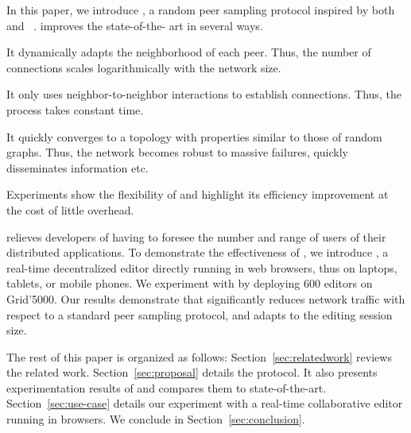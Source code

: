 In this paper, we introduce \SPRAY, a random peer sampling protocol
inspired by both \SCAMP~\cite{ganesh2003peer} and
\CYCLON~\cite{voulgaris2005cyclon}. \SPRAY improves the state-of-the-
art in several ways. 
\begin{inparaenum}[(i)]
\item It dynamically adapts the neighborhood of each peer. Thus, the
  number of connections scales logarithmically with the network size.
\item It only uses neighbor-to-neighbor interactions to establish
  connections. Thus, the process takes constant time.
\item It quickly converges to a topology with properties similar to
  those of random graphs. Thus, the network becomes robust to massive
  failures, quickly disseminates information etc.
\item Experiments show the flexibility of \SPRAY and highlight its
  efficiency improvement at the cost of little overhead.
\end{inparaenum}

\SPRAY relieves developers of having to foresee the number and range of users of
their distributed applications.  To demonstrate the effectiveness of \SPRAY, we
introduce \CRATE, a real-time decentralized editor directly running in web
browsers, thus on laptops, tablets, or mobile phones. We experiment with \CRATE
by deploying 600 editors on Grid'5000. Our results demonstrate that \SPRAY
significantly reduces network traffic with respect to a standard peer sampling
protocol, and adapts to the editing session size.

The rest of this paper is organized as follows: Section~\ref{sec:relatedwork}
reviews the related work. Section~\ref{sec:proposal} details the \SPRAY
protocol. It also presents experimentation results of \SPRAY and compares them
to state-of-the-art. Section~\ref{sec:use-case} details our experiment with
\CRATE a real-time collaborative editor running in browsers. We conclude in
Section~\ref{sec:conclusion}.

